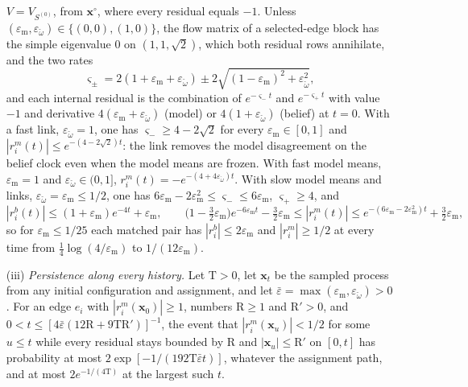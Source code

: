 \begin{enumerate}
$V=V_{S^{(0)}}$, from $\mathbf x^\circ$, where every residual equals $-1$. Unless
$(\varepsilon_{\mathrm m},\varepsilon_{\check\omega})\in\{(0,0),(1,0)\}$, the flow matrix
of a selected-edge block has the simple eigenvalue $0$ on $(1,1,\sqrt2)$, which both
residual rows annihilate, and the two rates
\begin{equation}
\varsigma_\pm=2(1+\varepsilon_{\mathrm m}+\varepsilon_{\check\omega})
\pm2\sqrt{(1-\varepsilon_{\mathrm m})^2+\varepsilon_{\check\omega}^2},
\label{eq:obs-cycle-block-rates}
\end{equation}
and each internal residual is the combination of $e^{-\varsigma_-t}$ and
$e^{-\varsigma_+t}$ with value $-1$ and derivative
$4(\varepsilon_{\mathrm m}+\varepsilon_{\check\omega})$ (model) or $4(1+\varepsilon_{\check\omega})$
(belief) at $t=0$. With a fast link, $\varepsilon_{\check\omega}=1$, one has
$\varsigma_-\ge4-2\sqrt2$ for every $\varepsilon_{\mathrm m}\in[0,1]$ and
$|r^m_i(t)|\le e^{-(4-2\sqrt2)t}$: the link removes the model disagreement on the
belief clock even when the model means are frozen. With fast model means,
$\varepsilon_{\mathrm m}=1$ and $\varepsilon_{\check\omega}\in(0,1]$,
$r^m_i(t)=-e^{-(4+4\varepsilon_{\check\omega})t}$. With slow model means and links,
$\varepsilon_{\check\omega}=\varepsilon_{\mathrm m}\le1/2$, one has
$6\varepsilon_{\mathrm m}-2\varepsilon_{\mathrm m}^2\le\varsigma_-\le6\varepsilon_{\mathrm m}$,
$\varsigma_+\ge4$, and
\begin{equation}
|r^b_i(t)|\le(1+\varepsilon_{\mathrm m})e^{-4t}+\varepsilon_{\mathrm m},\qquad
\bigl(1-\tfrac32\varepsilon_{\mathrm m}\bigr)e^{-6\varepsilon_{\mathrm m}t}-\tfrac32\varepsilon_{\mathrm m}
\le|r^m_i(t)|\le e^{-(6\varepsilon_{\mathrm m}-2\varepsilon_{\mathrm m}^2)t}+\tfrac32\varepsilon_{\mathrm m},
\label{eq:obs-cycle-slow-link-bounds}
\end{equation}
so for $\varepsilon_{\mathrm m}\le1/25$ each matched pair has
$|r^b_i|\le2\varepsilon_{\mathrm m}$ and $|r^m_i|\ge1/2$ at every time from
$\tfrac14\log(4/\varepsilon_{\mathrm m})$ to $1/(12\varepsilon_{\mathrm m})$.
\item[(iii)] \emph{Persistence along every history.} Let $\mathrm T>0$, let
$\mathbf x_t$ be the sampled process from any initial configuration and
assignment, and let $\bar\varepsilon=\max(\varepsilon_{\mathrm m},\varepsilon_{\check\omega})>0$.
For an edge $e_i$ with $|r^m_i(\mathbf x_0)|\ge1$, numbers $\mathrm R\ge1$ and
$\mathrm R'>0$, and $0<t\le[4\bar\varepsilon(12\mathrm R+9\mathrm T\mathrm R')]^{-1}$,
the event that $|r^m_i(\mathbf x_u)|<1/2$ for some $u\le t$ while every residual
stays bounded by $\mathrm R$ and $|\mathbf x_u|\le\mathrm R'$ on $[0,t]$ has
probability at most $2\exp[-1/(192\mathrm T\bar\varepsilon t)]$, whatever the
assignment path, and at most $2e^{-1/(4\mathrm T)}$ at the largest such $t$.
\end{enumerate}
